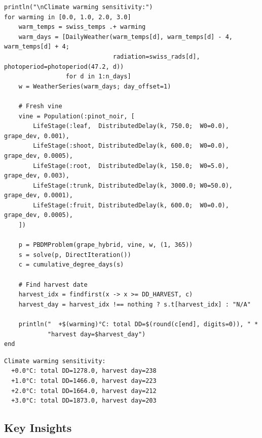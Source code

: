 \begin{verbatim}
println("\nClimate warming sensitivity:")
for warming in [0.0, 1.0, 2.0, 3.0]
    warm_temps = swiss_temps .+ warming
    warm_days = [DailyWeather(warm_temps[d], warm_temps[d] - 4, warm_temps[d] + 4;
                              radiation=swiss_rads[d], photoperiod=photoperiod(47.2, d))
                 for d in 1:n_days]
    w = WeatherSeries(warm_days; day_offset=1)

    # Fresh vine
    vine = Population(:pinot_noir, [
        LifeStage(:leaf,  DistributedDelay(k, 750.0;  W0=0.0), grape_dev, 0.001),
        LifeStage(:shoot, DistributedDelay(k, 600.0;  W0=0.0), grape_dev, 0.0005),
        LifeStage(:root,  DistributedDelay(k, 150.0;  W0=5.0), grape_dev, 0.003),
        LifeStage(:trunk, DistributedDelay(k, 3000.0; W0=50.0), grape_dev, 0.0001),
        LifeStage(:fruit, DistributedDelay(k, 600.0;  W0=0.0), grape_dev, 0.0005),
    ])

    p = PBDMProblem(grape_hybrid, vine, w, (1, 365))
    s = solve(p, DirectIteration())
    c = cumulative_degree_days(s)

    # Find harvest date
    harvest_idx = findfirst(x -> x >= DD_HARVEST, c)
    harvest_day = harvest_idx !== nothing ? s.t[harvest_idx] : "N/A"

    println("  +$(warming)°C: total DD=$(round(c[end], digits=0)), " *
            "harvest day=$harvest_day")
end
\end{verbatim}




\begin{verbatim}
Climate warming sensitivity:
  +0.0°C: total DD=1278.0, harvest day=238
  +1.0°C: total DD=1466.0, harvest day=223
  +2.0°C: total DD=1664.0, harvest day=212
  +3.0°C: total DD=1873.0, harvest day=203
\end{verbatim}



\subsection{Key Insights}



\label{7549919537174593161}{}


